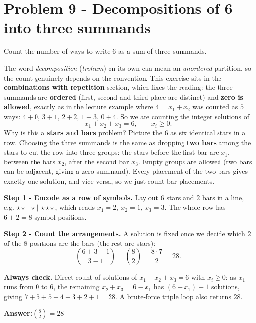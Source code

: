 \documentclass[11pt,a4paper]{article}
\newcommand{\answer}[1]{\begin{answerbox}\centering\textbf{Answer:}\quad #1\end{answerbox}}
\begin{document}
\section*{Problem 9 - Decompositions of 6 into three summands}

\begin{problembox}[9]
Count the number of ways to write $6$ as a sum of three summands.
\end{problembox}

\begin{ideabox}
The word \emph{decomposition} (\emph{trohum}) on its own can mean an \emph{unordered} partition,
so the count genuinely depends on the convention. This exercise sits in the \textbf{combinations
with repetition} section, which fixes the reading: the three summands are \textbf{ordered} (first,
second and third place are distinct) and \textbf{zero is allowed}, exactly as in the lecture example where
$4=x_1+x_2$ was counted as $5$ ways: $4{+}0,\,3{+}1,\,2{+}2,\,1{+}3,\,0{+}4$. So we are counting the
integer solutions of
$$x_1+x_2+x_3=6,\qquad x_i\ge 0.$$
Why is this a \textbf{stars and bars} problem? Picture the $6$ as six identical stars in a row.
Choosing the three summands is the same as dropping \textbf{two bars} among the stars to cut the row
into three groups: the stars before the first bar are $x_1$, between the bars $x_2$, after the second
bar $x_3$. Empty groups are allowed (two bars can be adjacent, giving a zero summand). Every
placement of the two bars gives exactly one solution, and vice versa, so we just count bar
placements.
\end{ideabox}

\textbf{Step 1 - Encode as a row of symbols.}
Lay out $6$ stars and $2$ bars in a line, e.g. $\star\star\,|\,\star\,|\,\star\star\star$, which reads
$x_1=2,\ x_2=1,\ x_3=3$. The whole row has $6+2=8$ symbol positions.

\textbf{Step 2 - Count the arrangements.}
A solution is fixed once we decide which $2$ of the $8$ positions are the bars (the rest are stars):
$$\binom{6+3-1}{3-1}=\binom{8}{2}=\frac{8\cdot 7}{2}=28.$$

\textbf{Always check.} Direct count of solutions of $x_1+x_2+x_3=6$ with $x_i\ge0$: as $x_1$ runs
from $0$ to $6$, the remaining $x_2+x_3=6-x_1$ has $(6-x_1)+1$ solutions, giving
$7+6+5+4+3+2+1=28$. A brute-force triple loop also returns $28$. \checkmark

\answer{$\displaystyle \binom{8}{2}=28$}
\end{document}
